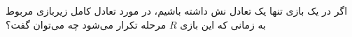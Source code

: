 اگر در یک بازی تنها یک تعادل نش داشته باشیم، در مورد تعادل کامل زیربازی مربوط به زمانی که این بازی
$R$
مرحله تکرار می‌شود چه می‌توان گفت؟